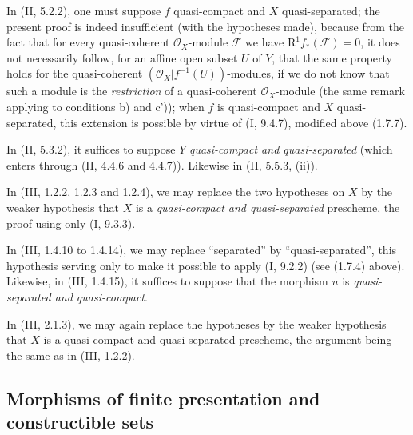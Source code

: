 \begin{env}[1.7.18]
\label{IV.1.7.18}
In (II, 5.2.2), one must suppose $f$ quasi-compact and $X$ quasi-separated;
the present proof is indeed insufficient (with the hypotheses made),
because from the fact that for every quasi-coherent $\mathcal O_X$-module
$\mathcal F$ we have $\mathrm R^1f_*(\mathcal F)=0$, it does not necessarily
follow, for an affine open subset $U$ of $Y$, that the same property holds
for the quasi-coherent $(\mathcal O_X|f^{-1}(U))$-modules, if we do not know
that such a module is the \emph{restriction} of a quasi-coherent
$\mathcal O_X$-module (the same remark applying to conditions b) and c'));
when $f$ is quasi-compact and $X$ quasi-separated, this extension is possible
by virtue of (I, 9.4.7), modified above (1.7.7).
\end{env}

\begin{env}[1.7.19]
\label{IV.1.7.19}
In (II, 5.3.2), it suffices to suppose $Y$ \emph{quasi-compact and
quasi-separated} (which enters through (II, 4.4.6 and 4.4.7)). Likewise in
(II, 5.5.3, (ii)).
\end{env}

\begin{env}[1.7.20]
\label{IV.1.7.20}
In (III, 1.2.2, 1.2.3 and 1.2.4), we may replace the two hypotheses on
$X$ by the weaker hypothesis that $X$ is a \emph{quasi-compact
and quasi-separated} prescheme, the proof using only (I, 9.3.3).
\end{env}

\begin{env}[1.7.21]
\label{IV.1.7.21}
In (III, 1.4.10 to 1.4.14), we may replace ``separated'' by
``quasi-separated'', this hypothesis serving only to make it possible to
apply (I, 9.2.2) (see (1.7.4) above). Likewise, in (III, 1.4.15), it
suffices to suppose that the morphism $u$ is \emph{quasi-separated and
quasi-compact}.
\end{env}

\begin{env}[1.7.22]
\label{IV.1.7.22}
In (III, 2.1.3), we may again replace the hypotheses by the weaker
hypothesis that $X$ is a quasi-compact and quasi-separated prescheme, the
argument being the same as in (III, 1.2.2).
\end{env}

\subsection{Morphisms of finite presentation and constructible sets}
\label{subsection:IV.1.8}

